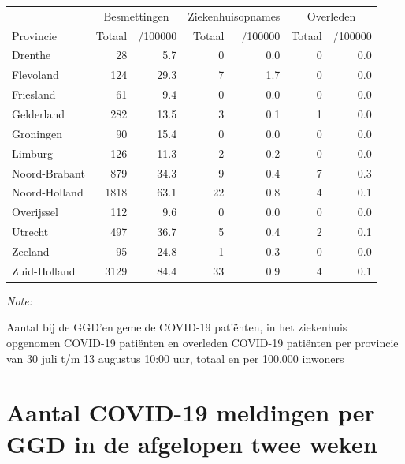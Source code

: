 \documentclass[
  english,
  man,floatsintext]{apa6}
\begin{document}
\begin{table}[H]
\centering
\begin{threeparttable}
\begin{tabular}{lrrrrrr}
\toprule
\multicolumn{1}{c}{ } & \multicolumn{2}{c}{Besmettingen} & \multicolumn{2}{c}{Ziekenhuisopnames} & \multicolumn{2}{c}{Overleden} \\
\cmidrule(l{3pt}r{3pt}){2-3} \cmidrule(l{3pt}r{3pt}){4-5} \cmidrule(l{3pt}r{3pt}){6-7}
Provincie & Totaal & /100000 & Totaal & /100000 & Totaal & /100000\\
\midrule
Drenthe & 28 & 5.7 & 0 & 0.0 & 0 & 0.0\\
Flevoland & 124 & 29.3 & 7 & 1.7 & 0 & 0.0\\
Friesland & 61 & 9.4 & 0 & 0.0 & 0 & 0.0\\
Gelderland & 282 & 13.5 & 3 & 0.1 & 1 & 0.0\\
Groningen & 90 & 15.4 & 0 & 0.0 & 0 & 0.0\\
Limburg & 126 & 11.3 & 2 & 0.2 & 0 & 0.0\\
Noord-Brabant & 879 & 34.3 & 9 & 0.4 & 7 & 0.3\\
Noord-Holland & 1818 & 63.1 & 22 & 0.8 & 4 & 0.1\\
Overijssel & 112 & 9.6 & 0 & 0.0 & 0 & 0.0\\
Utrecht & 497 & 36.7 & 5 & 0.4 & 2 & 0.1\\
Zeeland & 95 & 24.8 & 1 & 0.3 & 0 & 0.0\\
Zuid-Holland & 3129 & 84.4 & 33 & 0.9 & 4 & 0.1\\
\bottomrule
\end{tabular}
\begin{tablenotes}
\item \textit{Note: } 
\item Aantal bij de GGD’en gemelde COVID-19 patiënten, in het ziekenhuis opgenomen COVID-19 patiënten en overleden COVID-19 patiënten per provincie van 30 juli t/m 13 augustus 10:00 uur, totaal en per 100.000 inwoners
\end{tablenotes}
\end{threeparttable}
\end{table}

\newpage

\hypertarget{aantal-covid-19-meldingen-per-ggd-in-de-afgelopen-twee-weken}{%
\section{Aantal COVID-19 meldingen per GGD in de afgelopen twee weken}\label{aantal-covid-19-meldingen-per-ggd-in-de-afgelopen-twee-weken}}
\end{document}
